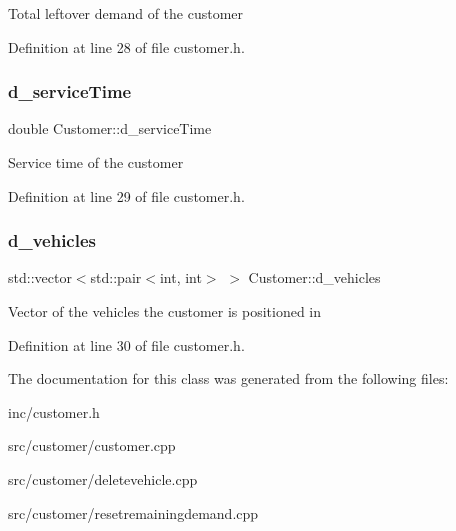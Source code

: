 Total leftover demand of the customer 

Definition at line 28 of file customer.\+h.

\mbox{\label{class_customer_aa220a35dae020652125de1099cc8e178}} 
\subsubsection{\texorpdfstring{d\+\_\+service\+Time}{d\_serviceTime}}
{\footnotesize\ttfamily double Customer\+::d\+\_\+service\+Time\hspace{0.3cm}{\ttfamily [private]}}

Service time of the customer 

Definition at line 29 of file customer.\+h.

\mbox{\label{class_customer_a51f0603ebcf0712f223b34d66eae0f0c}} 
\subsubsection{\texorpdfstring{d\+\_\+vehicles}{d\_vehicles}}
{\footnotesize\ttfamily std\+::vector$<$std\+::pair$<$int, int$>$ $>$ Customer\+::d\+\_\+vehicles\hspace{0.3cm}{\ttfamily [private]}}

Vector of the vehicles the customer is positioned in 

Definition at line 30 of file customer.\+h.



The documentation for this class was generated from the following files\+:\begin{DoxyCompactItemize}
\item 
inc/customer.\+h\item 
src/customer/customer.\+cpp\item 
src/customer/deletevehicle.\+cpp\item 
src/customer/resetremainingdemand.\+cpp\end{DoxyCompactItemize}
